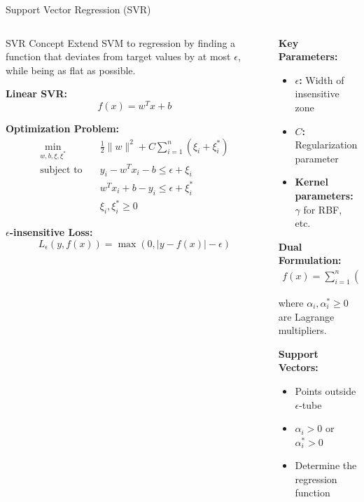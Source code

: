 \documentclass[8pt,aspectratio=1610]{beamer}
\begin{document}
\begin{frame}{Support Vector Regression (SVR)}
\begin{columns}[t]
\begin{column}{0.48\textwidth}
\begin{block}{SVR Concept}
Extend SVM to regression by finding a function that deviates from target values by at most $\epsilon$, while being as flat as possible.
\end{block}

\vspace{0.3cm}
\textbf{Linear SVR:}
$$f(x) = w^T x + b$$

\vspace{0.3cm}
\textbf{Optimization Problem:}
\begin{align}
\min_{w,b,\xi,\xi^*} \quad &\frac{1}{2}\|w\|^2 + C\sum_{i=1}^n(\xi_i + \xi_i^*) \\
\text{subject to} \quad &y_i - w^T x_i - b \leq \epsilon + \xi_i \\
&w^T x_i + b - y_i \leq \epsilon + \xi_i^* \\
&\xi_i, \xi_i^* \geq 0
\end{align}

\vspace{0.3cm}
\textbf{$\epsilon$-insensitive Loss:}
$$L_\epsilon(y, f(x)) = \max(0, |y - f(x)| - \epsilon)$$
\end{column}

\begin{column}{0.48\textwidth}
\textbf{Key Parameters:}
\vspace{0.2cm}

\begin{itemize}
\setlength{\itemsep}{1pt}
\item \textbf{$\epsilon$:} Width of insensitive zone
\item \textbf{$C$:} Regularization parameter
\item \textbf{Kernel parameters:} $\gamma$ for RBF, etc.
\end{itemize}

\vspace{0.3cm}
\textbf{Dual Formulation:}
\begin{align}
f(x) = \sum_{i=1}^n (\alpha_i - \alpha_i^*) K(x_i, x) + b
\end{align}

where $\alpha_i, \alpha_i^* \geq 0$ are Lagrange multipliers.

\vspace{0.3cm}
\textbf{Support Vectors:}
\begin{itemize}
\setlength{\itemsep}{1pt}
\item Points outside $\epsilon$-tube
\item $\alpha_i > 0$ or $\alpha_i^* > 0$
\item Determine the regression function
\end{itemize}


\end{column}
\end{columns}
\end{frame}
\end{document}
